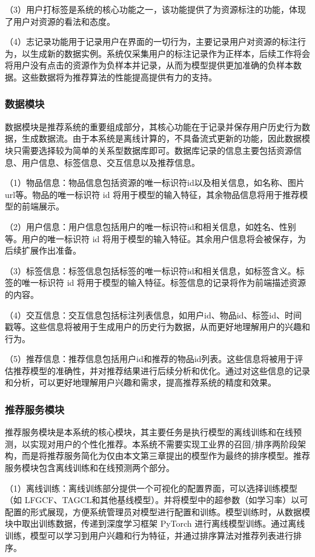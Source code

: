 （3）用户打标签是系统的核心功能之一，该功能提供了为资源标注的功能，体现了用户对资源的看法和态度。

（4）志记录功能用于记录用户在界面的一切行为，主要记录用户对资源的标注行为，以生成新的数据实例。系统仅采集用户的标注记录作为正样本，后续工作将会将用户没有点击的资源作为负样本并记录，从而为模型提供更加准确的负样本数据。这些数据将为推荐算法的性能提高提供有力的支持。

\subsubsection{数据模块}
数据模块是推荐系统的重要组成部分，其核心功能在于记录并保存用户历史行为数据，生成数据流。由于本系统是离线计算的，不具备流式更新的功能，因此数据模块只需要选择较为简单的关系型数据库即可。数据库记录的信息主要包括资源信息、用户信息、标签信息、交互信息以及推荐信息。

（1）物品信息：物品信息包括资源的唯一标识符id以及相关信息，如名称、图片url等。物品的唯一标识符 id 将用于模型的输入特征，其余物品信息将用于推荐模型的前端展示。

（2）用户信息：用户信息包括用户的唯一标识符id和相关信息，如姓名、性别等。用户的唯一标识符 id 将用于模型的输入特征。其余用户信息将会被保存，为后续扩展作出准备。

（3）标签信息：标签信息包括标签的唯一标识符id和相关信息，如标签含义。标签的唯一标识符 id 将用于模型的输入特征。标签信息的记录将作为前端描述资源的内容。

（4）交互信息：交互信息包括标注列表信息，如用户id、物品id、标签id、时间戳等。这些信息将被用于生成用户的历史行为数据，从而更好地理解用户的兴趣和行为。

（5）推荐信息：推荐信息包括用户id和推荐的物品id列表。这些信息将被用于评估推荐模型的准确性，并对推荐结果进行后续分析和优化。通过对这些信息的记录和分析，可以更好地理解用户兴趣和需求，提高推荐系统的精度和效果。

\subsubsection{推荐服务模块}
推荐服务模块是本系统的核心模块，其主要任务是执行模型的离线训练和在线预测，以实现对用户的个性化推荐。本系统不需要实现工业界的召回/排序两阶段架构，而是将推荐服务简化为仅由本文第三章提出的模型作为最终的排序模型。推荐服务模块包含离线训练和在线预测两个部分。

（1）离线训练：离线训练部分提供一个可视化的配置界面，可以选择训练模型（如 LFGCF、TAGCL和其他基线模型）。并将模型中的超参数（如学习率）以可配置的形式展现，方便系统管理员对模型进行配置和训练。模型训练时，从数据模块中取出训练数据，传递到深度学习框架 PyTorch 进行离线模型训练。通过离线训练，模型可以学习到用户兴趣和行为特征，并通过排序算法对推荐列表进行排序。

